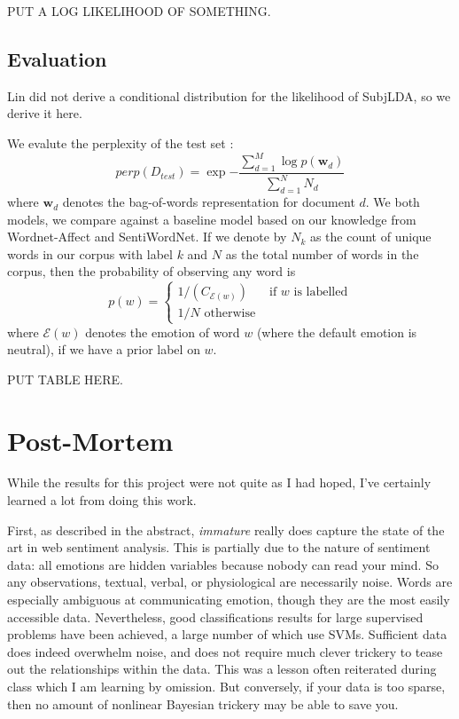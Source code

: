 \documentclass{article}
\begin{document}
PUT A LOG LIKELIHOOD OF SOMETHING.

\subsection{Evaluation}
Lin did not derive a conditional distribution for the likelihood of SubjLDA, so we derive it here.

We evalute the perplexity of the test set \citep{blei03}:
\begin{equation}
perp(D_{test}) = \exp{-\frac{\sum_{d=1}^M \log{p(\mathbf{w}_d)}}{\sum_{d=1}^N N_d}}
\end{equation}
where $\mathbf{w}_d$ denotes the bag-of-words representation for
document $d$. We both models, we compare against a baseline model
based on our knowledge from Wordnet-Affect and SentiWordNet. If we
denote by $N_k$ as the count of unique words in our corpus with
label $k$ and $N$ as the total number of words in the corpus, then
the probability of observing any word is
\begin{equation}
p(w) = \begin{cases} 1 / \left( {C_{\mathcal{E}(w)}} \right) & \mbox{if } w \mbox{ is labelled} \\
                     1/ N \mbox{ otherwise }
       \end{cases}
\end{equation}
where $\mathcal{E}(w)$ denotes the emotion of word $w$ (where the
default emotion is neutral), if we have a prior label on $w$.

PUT TABLE HERE.

\section{Post-Mortem}
While the results for this project were not quite as I had hoped,
I've certainly learned a lot from doing this work.

First, as described in the abstract, \emph{immature} really does
capture the state of the art in web sentiment analysis. This is partially
due to the nature of sentiment data: all emotions are hidden variables
because nobody can read your mind. So any observations, textual,
verbal, or physiological are necessarily noise. Words are especially
ambiguous at communicating emotion, though they are the most easily
accessible data. Nevertheless, good classifications results for
large supervised problems have been achieved, a large number of which
use SVMs. Sufficient data does indeed overwhelm noise, and does not
require much clever trickery to tease out the relationships within the
data. This was a lesson often reiterated during class which I am
learning by omission. But conversely, if your data is too sparse,
then no amount of nonlinear Bayesian trickery may be able to save you.

\begin{small}

 
\end{small}
\end{document}
